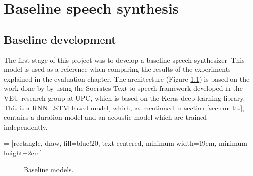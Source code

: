 \chapter{Baseline speech synthesis}



\section{Baseline development}

The first stage of this project was to develop a baseline speech synthesizer. This model is used as a reference when comparing the results of the experiments explained in the evaluation chapter. The architecture (Figure \ref{fig:lstm-tts}) is based on the work done by \cite{pascual2016deep} by using the Socrates Text-to-speech framework developed in the VEU research group at UPC, which is based on the Keras deep learning library. This is a RNN-LSTM based model, which, as mentioned in section \ref{sec:rnn-tts}, contains a duration model and an acoustic model which are trained independently.

 = [rectangle, draw, fill=blue!20, text centered, minimum width=19em, minimum height=2em]

\begin{figure}[h]
    \centering
    \caption{Baseline models.}
    \label{fig:lstm-tts}
\end{figure}

